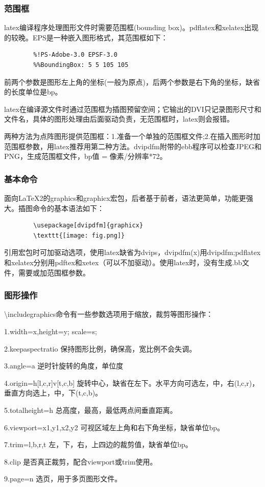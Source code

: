 \documentclass[16pt]{article}
\begin{document}
\subsubsection{范围框}
    latex编译程序处理图形文件时需要范围框(bounding box)。pdflatex和xelatex出现的较晚。EPS是一种嵌入图形格式，其范围框如下：\par
    \begin{lstlisting}
        %!PS-Adobe-3.0 EPSF-3.0
        %%BoundingBox: 5 5 105 105
    \end{lstlisting} \par
    前两个参数是图形左上角的坐标(一般为原点)，后两个参数是右下角的坐标，缺省的长度单位是bp。 \par
    latex在编译源文件时通过范围框为插图预留空间；它输出的DVI只记录图形尺寸和文件名，具体的图形处理由后面驱动负责，无范围框时，latex则会报错。 \par
    两种方法为点阵图形提供范围框：1.准备一个单独的范围框文件;2.在插入图形时加范围框参数，用latex推荐用第二种方法。dvipdfm附带的ebb程序可以检查JPEG和PNG，生成范围框文件，bp值 = 像素/分辨率*72。 \par
\subsubsection{基本命令}
    面向\LaTeX{}2的graphics和graphicx宏包，后者基于前者，语法更简单，功能更强大。插图命令的基本语法如下：\par
    \begin{lstlisting}
        \usepackage[dvipdfm]{graphicx}
        \texttt{[image: fig.png]}
    \end{lstlisting} \par
    引用宏包时可加驱动选项，使用latex缺省为dvips，dvipdfm(x)用dvipdfm;pdflatex和xelatex分别用pdftex和xetex（可以不加驱动）。使用latex时，没有生成.bb文件，需要或加范围框参数。
\subsubsection{图形操作}
    \textbackslash includegraphics命令有一些参数选项用于缩放，裁剪等图形操作：\par
    1.width=x,height=y; \quad scale=s; \par 
    2.keepaspectratio \quad  保持图形比例，确保高，宽比例不会失调。 \par
    3.angle=a \quad 逆时针旋转的角度，单位度 \par
    4.origin=h[l,c,r]v[t,c,b] \quad 旋转中心，缺省在左下。水平方向可选左，中，右(l,c,r)，垂直方向选上，中，下(t,c,b)。 \par
    5.totalheight=h \quad 总高度，最高，最低两点间垂直距离。 \par
    6.viewport=x1,y1,x2,y2 \quad 可视区域左上角和右下角坐标，缺省单位bp。 \par
    7.trim=l,b,r,t \quad 左，下，右，上四边的裁剪值，缺省单位bp。\par
    8.clip \quad 是否真正裁剪，配合viewport或trim使用。 \par
    9.page=n \quad 选页，用于多页图形文件。 \par
\end{document}
